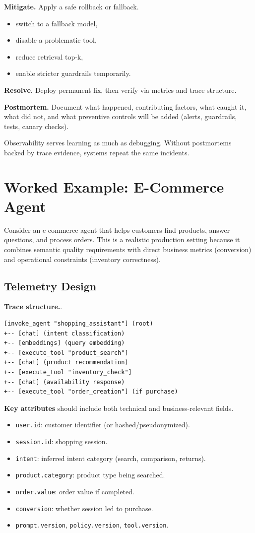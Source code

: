 \textbf{Mitigate.} Apply a safe rollback or fallback.
\begin{itemize}
\item switch to a fallback model,
\item disable a problematic tool,
\item reduce retrieval top-k,
\item enable stricter guardrails temporarily.
\end{itemize}

\textbf{Resolve.} Deploy permanent fix, then verify via metrics and trace structure.

\textbf{Postmortem.} Document what happened, contributing factors, what caught it, what did not, and what preventive controls will be added (alerts, guardrails, tests, canary checks).

Observability serves learning as much as debugging. Without postmortems backed by trace evidence, systems repeat the same incidents.

\section{Worked Example: E-Commerce Agent}

Consider an e-commerce agent that helps customers find products, answer questions, and process orders. This is a realistic production setting because it combines semantic quality requirements with direct business metrics (conversion) and operational constraints (inventory correctness).

\subsection{Telemetry Design}

\textbf{Trace structure.}.
\begin{verbatim}
[invoke_agent "shopping_assistant"] (root)
+-- [chat] (intent classification)
+-- [embeddings] (query embedding)
+-- [execute_tool "product_search"]
+-- [chat] (product recommendation)
+-- [execute_tool "inventory_check"]
+-- [chat] (availability response)
+-- [execute_tool "order_creation"] (if purchase)
\end{verbatim}

\textbf{Key attributes} should include both technical and business-relevant fields.
\begin{itemize}
\item \texttt{user.id}: customer identifier (or hashed/pseudonymized).
\item \texttt{session.id}: shopping session.
\item \texttt{intent}: inferred intent category (search, comparison, returns).
\item \texttt{product.category}: product type being searched.
\item \texttt{order.value}: order value if completed.
\item \texttt{conversion}: whether session led to purchase.
\item \texttt{prompt.version}, \texttt{policy.version}, \texttt{tool.version}.
\end{itemize}

